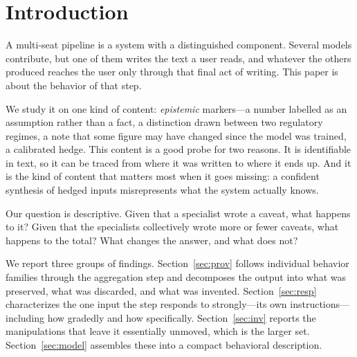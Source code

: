 \documentclass[11pt]{article}
\begin{document}
\begin{abstract}
judge-recognised commitment barely moves and the writer never once overrules
a specialist. The step's \emph{surface}---structure, citations, marker
density---is programmable, each clause moving precisely the behavior it
names; its \emph{stance}---what it supplies unbidden and what it will
commit to---resisted every intervention tested: prompting, fine-tuning under
three objective classes, revision, and instruction. What survives for
practice is external checking and disclosure, whose own per-item validation
we report, including where it falls short. We offer these as measured
regularities of the aggregation step rather than as an argument for or
against building such pipelines.
\end{abstract}

\section{Introduction}
A multi-seat pipeline is a system with a distinguished component. Several
models contribute, but one of them writes the text a user reads, and whatever
the others produced reaches the user only through that final act of writing.
This paper is about the behavior of that step.

We study it on one kind of content: \emph{epistemic} markers---a number
labelled as an assumption rather than a fact, a distinction drawn between two
regulatory regimes, a note that some figure may have changed since the model
was trained, a calibrated hedge. This content is a good probe for two reasons.
It is identifiable in text, so it can be traced from where it was written to
where it ends up. And it is the kind of content that matters most when it goes
missing: a confident synthesis of hedged inputs misrepresents what the system
actually knows.

Our question is descriptive. Given that a specialist wrote a caveat, what
happens to it? Given that the specialists collectively wrote more or fewer
caveats, what happens to the total? What changes the answer, and what does
not?

We report three groups of findings. Section~\ref{sec:prov} follows individual
behavior families through the aggregation step and decomposes the output into
what was preserved, what was discarded, and what was invented.
Section~\ref{sec:resp} characterizes the one input the step responds to
strongly---its own instructions---including how gradedly and how specifically.
Section~\ref{sec:inv} reports the manipulations that leave it essentially
unmoved, which is the larger set. Section~\ref{sec:model} assembles these into
a compact behavioral description.
\end{document}

